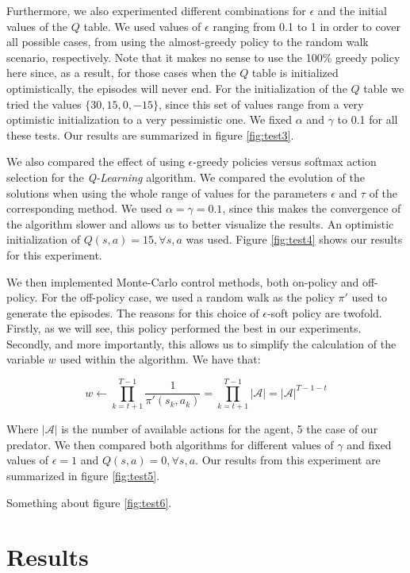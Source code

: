 \documentclass[a4paper,10pt]{article}
\begin{document}
Furthermore, we also experimented different combinations for $\epsilon$ and the initial values of the $Q$ table. We used values of $\epsilon$ ranging from 0.1 to 1 in order to cover all possible cases, from using the almost-greedy policy to the random walk scenario, respectively. Note that it makes no sense to use the 100\% greedy policy here since, as a result, for those cases when the $Q$ table is initialized optimistically, the episodes will never end. For the initialization of the $Q$ table we tried the values $\{30, 15, 0, -15 \}$, since this set of values range from a very optimistic initialization to a very pessimistic one. We fixed $\alpha$ and $\gamma$ to 0.1 for all these tests. Our results are summarized in figure \ref{fig:test3}.

We also compared the effect of using $\epsilon$-greedy policies versus softmax action selection for the \textit{Q-Learning} algorithm. We compared the evolution of the solutions when using the whole range of values for the parameters $\epsilon$ and $\tau$ of the corresponding method. We used $\alpha = \gamma = 0.1$, since this makes the convergence of the algorithm slower and allows us to better visualize the results. An optimistic initialization of $Q(s, a) = 15, \forall s, a$ was used. Figure \ref{fig:test4} shows our results for this experiment.

We then implemented Monte-Carlo control methods, both on-policy and off-policy. For the off-policy case, we used a random walk as the policy $\pi'$ used to generate the episodes. The reasons for this choice of $\epsilon$-soft policy are twofold. Firstly, as we will see, this policy performed the best in our experiments. Secondly, and more importantly, this allows us to simplify the calculation of the variable $w$ used within the algorithm. We have that:

$$ w \leftarrow \prod_{k = t + 1}^{T - 1} \frac{1}{\pi'(s_k, a_k)} = \prod_{k = t + 1}^{T - 1} | \mathcal{A} | = | \mathcal{A} |^{T - 1 - t}$$

Where $| \mathcal{A} |$ is the number of available actions for the agent, 5 the case of our predator. We then compared both algorithms for different values of $\gamma$ and fixed values of $\epsilon = 1$ and $Q(s, a) = 0, \forall s, a$. Our results from this experiment are summarized in figure \ref{fig:test5}.

Something about figure \ref{fig:test6}.

\newpage

\section{Results}
\end{document}
